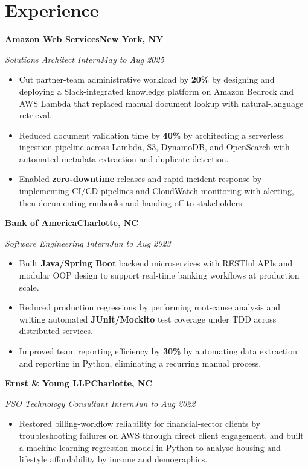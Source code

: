 \documentclass[letterpaper,10pt]{article}
\newcommand{\headrow}[2]{{\rightskip=0pt\noindent#1\hfill#2\par}}
\newcommand{\role}[4]{%
  \headrow{\textbf{#1}}{\textbf{#2}}%
  \headrow{\textit{#3}}{\textit{#4}}%
  \vspace{0.1em}%
}
\newenvironment{bullets}
  {\begin{itemize}[leftmargin=1.15em, itemsep=0.13em, parsep=0pt, topsep=0.22em, partopsep=0pt]}
  {\end{itemize}\vspace{0.3em}}
\begin{document}
\section{Experience}

\role{Amazon Web Services}{New York, NY}{Solutions Architect Intern}{May to Aug 2025}
\begin{bullets}
  \item Cut partner-team administrative workload by \textbf{20\%} by designing and deploying
        a Slack-integrated knowledge platform on Amazon Bedrock and AWS Lambda that replaced
        manual document lookup with natural-language retrieval.
  \item Reduced document validation time by \textbf{40\%} by architecting a serverless
        ingestion pipeline across Lambda, S3, DynamoDB, and OpenSearch with automated
        metadata extraction and duplicate detection.
  \item Enabled \textbf{zero-downtime} releases and rapid incident response by implementing
        CI/CD pipelines and CloudWatch monitoring with alerting, then documenting runbooks
        and handing off to stakeholders.
\end{bullets}

\role{Bank of America}{Charlotte, NC}{Software Engineering Intern}{Jun to Aug 2023}
\begin{bullets}
  \item Built \textbf{Java/Spring Boot} backend microservices with RESTful APIs and modular
        OOP design to support real-time banking workflows at production scale.
  \item Reduced production regressions by performing root-cause analysis and writing
        automated \textbf{JUnit/Mockito} test coverage under TDD across distributed services.
  \item Improved team reporting efficiency by \textbf{30\%} by automating data extraction and
        reporting in Python, eliminating a recurring manual process.
\end{bullets}

\role{Ernst \& Young LLP}{Charlotte, NC}{FSO Technology Consultant Intern}{Jun to Aug 2022}
\begin{bullets}
  \item Restored billing-workflow reliability for financial-sector clients by troubleshooting
        failures on AWS through direct client engagement, and built a machine-learning
        regression model in Python to analyse housing and lifestyle affordability by income
        and demographics.
\end{bullets}
\end{document}
